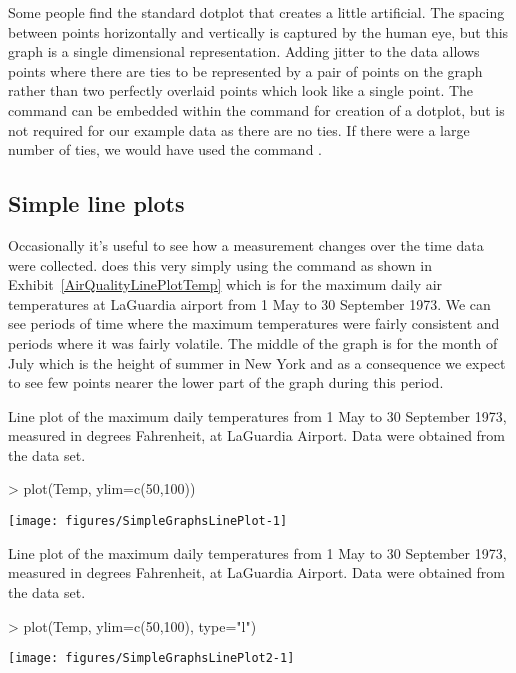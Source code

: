 Some people find the standard dotplot that \R{} creates a little artificial. The spacing between points horizontally and vertically is captured by the human eye, but this graph is a single dimensional representation. Adding jitter to the data allows points where there are ties to be represented by a pair of points on the graph rather than two perfectly overlaid points which look like a single point. The  command can be embedded within the command for creation of a dotplot, but is not required for our example data as there are no ties. If there were a large number of ties, we would have used the command .



\subsection{Simple line plots}

Occasionally it's useful to see how a measurement changes over the time data were collected. \R{} does this very simply using the  command as shown in Exhibit~\ref{AirQualityLinePlotTemp} which is for the maximum daily air temperatures at LaGuardia airport from 1 May to 30 September 1973. We can see periods of time where the maximum temperatures were fairly consistent and periods where it was fairly volatile. The middle of the graph is for the month of July which is the height of summer in New York and as a consequence we expect to see few points nearer the lower part of the graph during this period.
\begin{exhibit}
\begin{center}
\caption{Line plot of the maximum daily temperatures from 1 May to 30 September 1973, measured in degrees Fahrenheit, at LaGuardia Airport. Data were obtained from the  data set.}
\label{AirQualityLinePlotTemp}
\begin{Schunk}
\begin{Sinput}
> plot(Temp, ylim=c(50,100))
\end{Sinput}

\texttt{[image: figures/SimpleGraphsLinePlot-1]} \end{Schunk}
\end{center}
\end{exhibit}
\begin{exhibit}
\begin{center}
\caption{Line plot of the maximum daily temperatures from 1 May to 30 September 1973, measured in degrees Fahrenheit, at LaGuardia Airport. Data were obtained from the  data set.}
\label{AirQualityLinePlotTemp2}
\begin{Schunk}
\begin{Sinput}
> plot(Temp, ylim=c(50,100), type="l")
\end{Sinput}

\texttt{[image: figures/SimpleGraphsLinePlot2-1]} \end{Schunk}
\end{center}
\end{exhibit}

